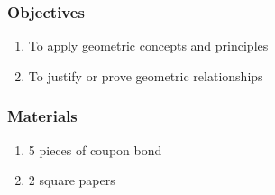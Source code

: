 \subsubsection*{Objectives}
\begin{enumerate}
\item To apply geometric concepts and principles
\item To justify or prove geometric relationships
\end{enumerate}
\subsubsection*{Materials}
\begin{enumerate}
\item 5 pieces of coupon bond
\item 2 square papers
\end{enumerate}
